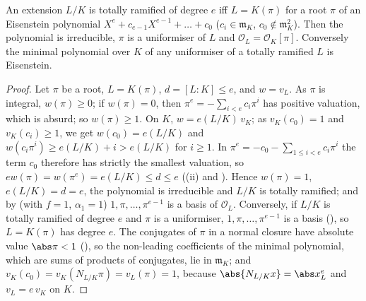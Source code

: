\begin{theorem}\label{thm:local:eisenstein}
An extension $L/K$ is totally ramified of degree $e$ iff $L=K(\pi)$ for a root $\pi$ of an Eisenstein polynomial $X^e+c_{e-1}X^{e-1}+\dots+c_0$
($c_i\in\mathfrak m_K$, $c_0\notin\mathfrak m_K^2$). Then the polynomial is irreducible, $\pi$ is a uniformiser of $L$ and $\mathcal O_L=\mathcal O_K[\pi]$.
Conversely the minimal polynomial over $K$ of any uniformiser of a totally ramified $L$ is Eisenstein.
\end{theorem}

\begin{proof}
Let $\pi$ be a root, $L=K(\pi)$, $d=[L:K]\le e$, and $w=v_L$. As $\pi$ is integral, $w(\pi)\ge0$; if $w(\pi)=0$, then $\pi^e=-\sum_{i<e}c_i\pi^i$ has positive
valuation, which is absurd; so $w(\pi)\ge1$. On $K$, $w=e(L/K)\,v_K$; as $v_K(c_0)=1$ and $v_K(c_i)\ge1$, we get $w(c_0)=e(L/K)$ and
$w(c_i\pi^i)\ge e(L/K)+i>e(L/K)$ for $i\ge1$. In $\pi^e=-c_0-\sum_{1\le i<e}c_i\pi^i$ the term $c_0$ therefore has strictly the smallest valuation,
so $ew(\pi)=w(\pi^e)=e(L/K)\le d\le e$ ((ii) and ). Hence
$w(\pi)=1$, $e(L/K)=d=e$, the polynomial is irreducible and $L/K$ is totally ramified; and by  (with $f=1$, $\alpha_1=1$)
$1,\pi,\dots,\pi^{e-1}$ is a basis of $\mathcal O_L$. Conversely, if $L/K$ is totally ramified of degree $e$ and $\pi$ is a uniformiser, $1,\pi,\dots,\pi^{e-1}$
is a basis (), so $L=K(\pi)$ has degree $e$. The conjugates of $\pi$ in a normal closure have absolute value $\abs\pi<1$
(), so the non-leading coefficients of the minimal polynomial, which are sums of products of conjugates, lie in
$\mathfrak m_K$; and $v_K(c_0)=v_K(N_{L/K}\pi)=v_L(\pi)=1$, because $\abs{N_{L/K}x}=\abs x_L^e$ and $v_L=e\,v_K$ on $K$.
\end{proof}

